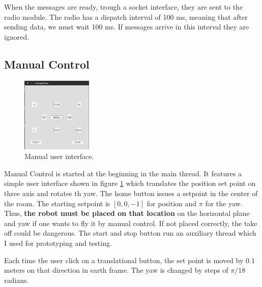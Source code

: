 When the messages are ready, trough a socket interface, they are sent to the radio module. The radio has a dispatch interval of 100 ms, meaning that after sending data, we must wait 100 ms. If messages arrive in this interval they are ignored. 

\subsection{Manual Control}

\begin{figure}[h]
\centering
 \includegraphics[width=0.3\textwidth]{mangui.png}
 \caption{Manual user interface.}
 \label{figure:mangui}
\end{figure}

Manual Control is started at the beginning in the main thread. It features a simple user interface shown in figure \ref{figure:mangui} which translates the position set point on three axis and rotates th yaw. The home button issues a setpoint in the center of the room. The starting setpoint is $[0,0,-1]$ for position and $\pi$ for the yaw. Thus, \textbf{the robot must be placed on that location} on the horizontal plane and yaw if one wants to fly it by manual control. If not placed correctly, the take off could be dangerous. The start and stop button run an auxiliary thread which I used for prototyping and testing. 

Each time the user click on a translational button, the set point is moved by $0.1$ meters on that direction in earth frame. The yaw is changed by steps of $\pi/18$ radians.


